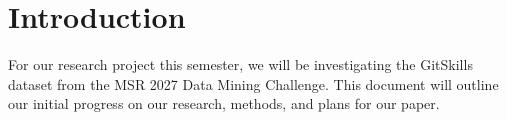 \section{Introduction}

For our research project this semester, we will be investigating the GitSkills dataset from the MSR 2027 Data Mining Challenge.
This document will outline our initial progress on our research, methods, and plans for our paper.
